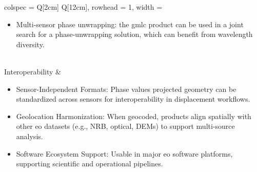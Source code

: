 \begin{longtblr}[
  caption = {Usability, Integrability, and Interoperability of "Multi-looked Complex" Products},
  label = {tab:mlc_characteristics},
]{
  colspec = {Q[2cm] Q[12cm]},
  rowhead = 1,
  width = \linewidth
}
\begin{itemize}
  \item Multi-sensor phase unwrapping: the \acs{gmlc} product can be used in a joint search for a phase-unwrapping solution, which can benefit from wavelength diversity.
\end{itemize}
\\
Interoperability &
\begin{itemize}
  \item Sensor-Independent Formats: Phase values projected geometry can be standardized across sensors for interoperability in displacement workflows.
  \item Geolocation Harmonization: When geocoded, products align spatially with other \acs{eo} datasets (e.g., NRB, optical, DEMs) to support multi-source analysis.
  \item Software Ecosystem Support: Usable in major \acs{eo} software platforms, supporting scientific and operational pipelines.
\end{itemize}
\\
\hline
\end{longtblr}

